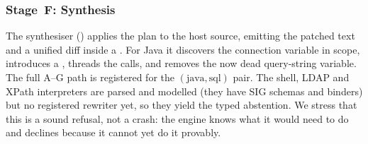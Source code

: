 \subsubsection{Stage~F: Synthesis}
The synthesiser () applies the plan to the host source,
emitting the patched text and a unified diff inside a .
For Java it discovers the connection variable in scope, introduces a
, threads the  calls, and removes the now
dead query-string variable. The full A--G path is registered for the
$(\text{java},\text{sql})$ pair. The shell, LDAP and XPath interpreters
are parsed and modelled (they have SIG schemas and binders) but no
registered rewriter yet, so they yield the typed 
abstention. We stress that this is a sound refusal, not a crash: the engine
knows what it would need to do and declines because it cannot yet do it
provably.


